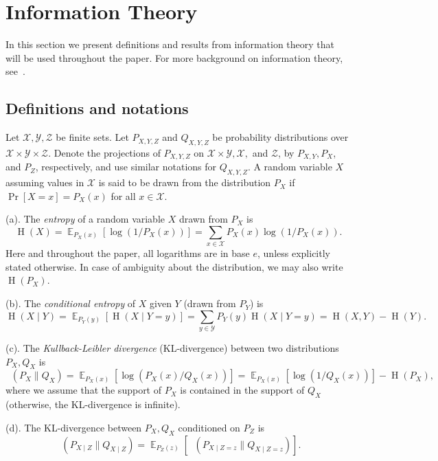 \documentclass[11pt]{article}
\DeclareMathOperator*{\E}{\mathbb{E}}
\DeclareMathOperator{\HH}{H}
\DeclareMathOperator{\KL}{D_{\text{KL}}}
\begin{document}
\section{Information Theory}
\label{sec:preliminaries}

In this section we present definitions and results from information theory that will be used throughout the paper. For more background on information theory, see~\cite{CoverT06}.

\subsection{Definitions and notations}

Let $\mathcal{X},\mathcal{Y},\mathcal{Z}$ be finite sets. Let $P_{X,Y,Z}$ and $Q_{X,Y,Z}$ be probability distributions over $\mathcal{X} \times \mathcal{Y} \times \mathcal{Z}$. Denote the projections of $P_{X,Y,Z}$ on $\mathcal{X} \times \mathcal{Y}, \mathcal{X},$ and $\mathcal{Z}$, by $P_{X,Y},P_X$, and $P_Z$, respectively, and use similar notations for $Q_{X,Y,Z}$. A random variable $X$ assuming values in $\mathcal{X}$ is said to be drawn from the distribution $P_X$ if $\Pr[X=x]=P_X(x)$ for all $x \in \mathcal{X}$.  

\medskip

\noindent (a). The \emph{entropy} of a random variable $X$ drawn from $P_X$ 
is $$\HH(X) = \E_{P_X(x)}[\log(1/P_X(x))] = \sum_{x \in \mathcal{X}} P_X(x) \log(1/P_X(x) ).$$
Here and throughout the paper, all logarithms are in base $e$, unless explicitly stated otherwise. In case of ambiguity about the distribution, we may also write $\HH(P_X)$.

\medskip

\noindent (b). The \emph{conditional entropy} of $X$ given $Y$ (drawn from $P_{Y}$) is
$$\HH(X \mid Y ) = \E_{P_Y(y)}[\HH(X \mid Y=y)] =  \sum_{y \in \mathcal{Y}} P_Y(y)\HH(X \mid Y=y) = \HH(X,Y) - \HH(Y).$$


\medskip

\noindent (c). The \emph{Kullback-Leibler divergence} (KL-divergence) between two distributions $P_X,Q_X$ is 
$$\KL( P_X \| Q_X ) = \E_{P_X(x)}[\log(P_X(x)/ Q_X(x))] = \E_{P_X(x)}[\log(1/ Q_X(x))] - \HH(P_X),$$
where we assume that the support of $P_X$ is contained in the support of $Q_X$ (otherwise, the KL-divergence is infinite).


\medskip 

\noindent (d). The KL-divergence between $P_X,Q_X$ conditioned on $P_Z$ is
$$\KL( P_{X \mid Z} \| Q_{X \mid Z} ) = \E_{P_Z(z)}[\KL(P_{X \mid Z = z} \| Q_{X \mid Z = z} )].$$
\end{document}
